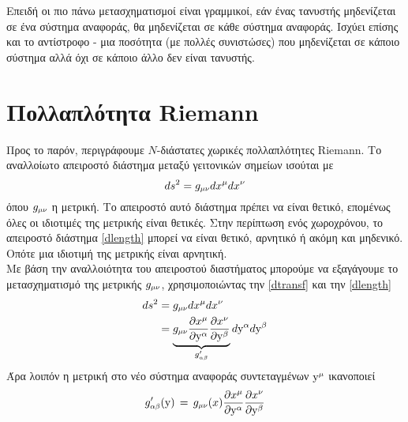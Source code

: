 Επειδή οι πιο πάνω μετασχηματισμοί είναι γραμμικοί, εάν ένας τανυστής μηδενίζεται σε ένα σύστημα αναφοράς, θα μηδενίζεται σε κάθε σύστημα αναφοράς. Ισχύει επίσης και το αντίστροφο - μια ποσότητα (με πολλές συνιστώσες) που μηδενίζεται σε κάποιο σύστημα αλλά όχι σε κάποιο άλλο δεν είναι τανυστής. 

\section{Πολλαπλότητα Riemann}
Προς το παρόν, περιγράφουμε $N$-διάστατες χωρικές πολλαπλότητες Riemann. Το αναλλοίωτο απειροστό διάστημα μεταξύ γειτονικών σημείων ισούται με
\begin{equation}\label{dlength}
    ds^2 = \g{\mu}{\nu}dx\indices{^\mu}dx\indices{^\nu} 
\end{equation}
όπου $\g{\mu}{\nu}$ η μετρική. Το απειροστό αυτό διάστημα πρέπει να είναι θετικό, επομένως όλες οι ιδιοτιμές της μετρικής είναι θετικές.
Στην περίπτωση ενός χωροχρόνου, το απειροστό διάστημα \eqref{dlength} μπορεί να είναι θετικό, αρνητικό ή ακόμη και μηδενικό. Οπότε μια ιδιοτιμή της μετρικής είναι αρνητική. \\

Με βάση την αναλλοιότητα του απειροστού διαστήματος μπορούμε να εξαγάγουμε το μετασχηματισμό της μετρικής $\g{\mu}{\nu}$, χρησιμοποιώντας την \eqref{dtransf} και την \eqref{dlength}
\begin{equation}
\begin{split}
    ds^2 &= \g{\mu}{\nu} dx\indices{^\mu}dx\indices{^\nu}\\
        &= \underbrace{\g{\mu}{\nu} \L[1]{\mu}{\alpha} \L[1]{\nu}{\beta}}_{\g{\alpha}{\beta}'} d\y\indices{^\alpha}d\y\indices{^\beta}
\end{split}
\end{equation}
Άρα λοιπόν η μετρική στο νέο σύστημα αναφοράς συντεταγμένων $\y\superscr{\mu}$ ικανοποιεί 
\begin{equation}\label{metrictrans}
    \g{\alpha}{\beta}'(\y)  \,=\, \g{\mu}{\nu}(x) \L[1]{\mu}{\alpha} \L[1]{\nu}{\beta}
\end{equation}

